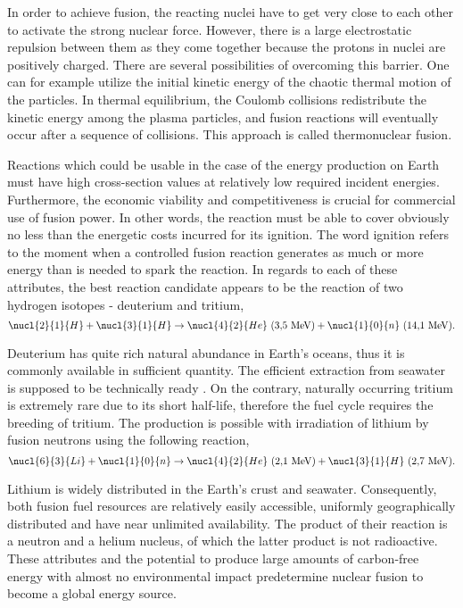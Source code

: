In order to achieve fusion, the reacting nuclei have to get very close to each other to activate the strong nuclear force. However, there is a large electrostatic repulsion between them as they come together because the protons in nuclei are positively charged. There are several possibilities of overcoming this barrier. One can for example utilize the initial kinetic energy of the chaotic thermal motion of the particles. In thermal equilibrium, the Coulomb collisions redistribute the kinetic energy among the plasma particles, and fusion reactions will eventually occur after a sequence of collisions. This approach is called thermonuclear fusion.

Reactions which could be usable in the case of the energy production on Earth must have high cross-section values at relatively low required incident energies. Furthermore, the economic viability and competitiveness is crucial for commercial use of fusion power. In other words, the reaction must be able to cover obviously no less than the energetic costs incurred for its ignition. The word ignition refers to the moment when a controlled fusion reaction generates as much or more energy than is needed to spark the reaction. In regards to each of these attributes, the best reaction candidate appears to be the reaction of two hydrogen isotopes - deuterium and tritium,
\begin{equation}
\nucl{2}{1}{H} + \nucl{3}{1}{H} \rightarrow \nucl{4}{2}{He} \ \mathrm{(3{,}5 \ MeV)} + \nucl{1}{0}{n} \ \mathrm{(14{,}1 \ MeV)}.
\end{equation}

Deuterium has quite rich natural abundance in Earth's oceans, thus it is commonly available in sufficient quantity. The efficient extraction from seawater is supposed to be technically ready \cite{bradshaw}. On the contrary, naturally occurring tritium is extremely rare due to its short half-life, therefore the fuel cycle requires the breeding of tritium. The production is possible with irradiation of lithium by fusion neutrons using the following reaction,
\begin{equation}
\nucl{6}{3}{Li} + \nucl{1}{0}{n} \rightarrow \nucl{4}{2}{He} \ \mathrm{(2{,}1 \ MeV)} + \nucl{3}{1}{H} \ \mathrm{(2{,}7 \ MeV)}.
\end{equation}

Lithium is widely distributed in the Earth's crust and seawater. Consequently, both fusion fuel resources are relatively easily accessible, uniformly geographically distributed and have near unlimited availability. The product of their reaction is a neutron and a helium nucleus, of which the latter product is not radioactive. These attributes and the potential to produce large amounts of carbon-free energy with almost no environmental impact predetermine nuclear fusion to become a global energy source.